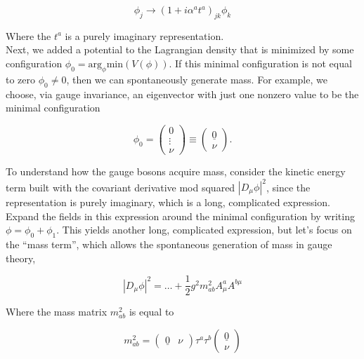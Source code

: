 \documentclass[10pt]{article}
\begin{document}
\begin{equation}
\phi_j \rightarrow (1 + i \alpha^a t^a)_{jk} \phi_k
\end{equation}

\noindent Where the $t^a$ is a purely imaginary representation. \\

\noindent Next, we added a potential to the Lagrangian density that is minimized by some configuration $\phi_0 = \text{arg}_{\phi} \text{min} (V(\phi))$. If this minimal configuration is not equal to zero $\phi_0 \ne 0$, then we can spontaneously generate mass. For example, we choose, via gauge invariance, an eigenvector with just one nonzero value to be the minimal configuration

\begin{equation}
\phi_0 = \begin{pmatrix} 0 \\ \vdots \\ \nu \end{pmatrix} \equiv \begin{pmatrix} \underline{0} \\ \nu \end{pmatrix}.
\end{equation}

\noindent To understand how the gauge bosons acquire mass, consider the kinetic energy term built with the covariant derivative mod squared $|D_\mu \phi |^2$, since the representation is purely imaginary, which is a long, complicated expression. Expand the fields in this expression around the minimal configuration by writing $\phi = \phi_0 + \phi_1$. This yields another long, complicated expression, but let's focus on the ``mass term'', which allows the spontaneous generation of mass in gauge theory,

\begin{equation}
|D_\mu \phi|^2 = \dots + \frac{1}{2} g^2 m_{ab}^2 A_\mu^a A^{b \mu}
\end{equation}

\noindent Where the mass matrix $m_{ab}^2$ is equal to

\begin{equation}
m_{ab}^2 = \begin{pmatrix} \underline{0} & \nu \end{pmatrix} \tau^a \tau^b \begin{pmatrix} \underline{0} \\ \nu \end{pmatrix}
\end{equation}
\end{document}
